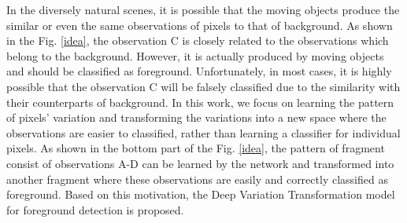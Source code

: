 \documentclass[journal]{IEEEtran}
\newcommand{\reffig}[1]{Fig. \ref{#1}}
\begin{document}
In the diversely natural scenes,
it is possible that the moving objects produce the similar or even the same observations of pixels to that of background.
As shown in the \reffig{idea},
the observation C is closely related to the observations which belong to the background. However, it is actually produced by moving objects and should be classified as foreground.
Unfortunately, in most cases, it is highly possible that the observation C will be falsely classified due to the similarity with their counterparts of background.
In this work, we focus on learning the pattern of pixels' variation and transforming the variations into a new space where the observations are easier to classified, rather than learning a classifier for individual pixels.
As shown in the bottom part of the \reffig{idea}, the pattern of fragment consist of observations A-D can be learned by the network and transformed into another fragment where these observations are easily and correctly classified as foreground.
Based on this motivation, the Deep Variation Transformation model for foreground detection is proposed.
% 
\end{document}
